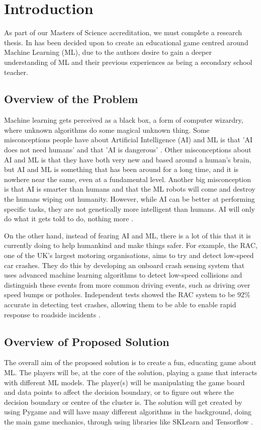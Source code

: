 \documentclass[a4paper,10pt]{article}
\begin{document}
\clearpage

\section{Introduction}

\small 
As part of our Masters of Science accreditation, we must complete a research thesis. In has been decided upon to create an educational game centred around Machine Learning (ML), due to the authors desire to gain a deeper understanding of ML and their previous experiences as being a secondary school teacher. 


\subsection{Overview of the Problem}
Machine learning gets perceived as a black box, a form of computer wizardry, where unknown algorithms do some magical unknown thing. Some misconceptions people have about Artificial Intelligence (AI) and ML is that 'AI does not need humans' and that 'AI is dangerous' \cite{quora5misconcepts}. Other misconceptions about AI and ML is that they have both very new and based around a human's brain, but AI and ML is something that has been around for a long time, and it is nowhere near the same, even at a fundamental level. Another big misconception is that AI is smarter than humans and that the ML robots will come and destroy the humans wiping out humanity. However, while AI can be better at performing specific tasks, they are not genetically more intelligent than humans. AI will only do what it gets told to do, nothing more \cite{quora5misconcepts}.

On the other hand, instead of fearing AI and ML, there is a lot of this that it is currently doing to help humankind and make things safer. For example, the RAC, one of the UK's largest motoring organisations, aims to try and detect low-speed car crashes. They do this by developing an onboard crash sensing system that uses advanced machine learning algorithms to detect low-speed collisions and distinguish these events from more common driving events, such as driving over speed bumps or potholes. Independent tests showed the RAC system to be 92\% accurate in detecting test crashes, allowing them to be able to enable rapid response to roadside incidents \cite{matlanintrotoml}.

\subsection{Overview of Proposed Solution}
The overall aim of the proposed solution is to create a fun, educating game about ML. The players will be, at the core of the solution, playing a game that interacts with different ML models. The player(s) will be manipulating the game board and data points to affect the decision boundary, or to figure out where the decision boundary or centre of the cluster is. The solution will get created by using  Pygame and will have many different algorithms in the background, doing the main game mechanics, through using libraries like SKLearn \cite{sklearn_api} and Tensorflow \cite{tensorflow2015-whitepaper}.
\end{document}
